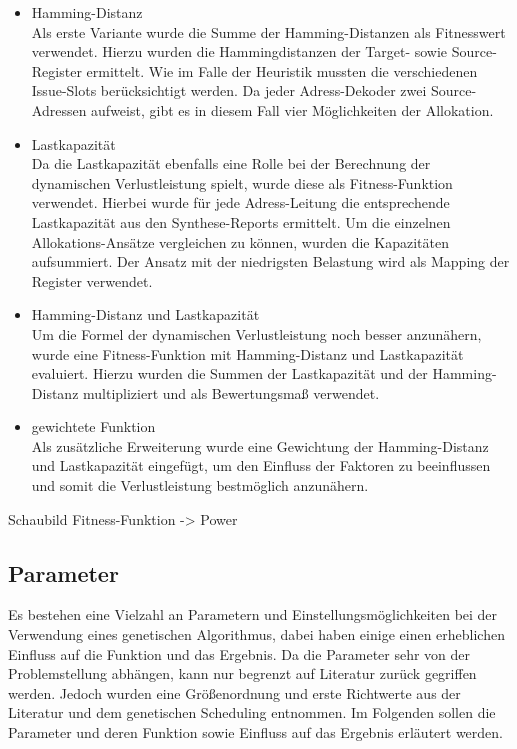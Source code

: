 \begin{itemize}
	\item Hamming-Distanz\\
		Als erste Variante wurde die Summe der Hamming-Distanzen als Fitnesswert verwendet. Hierzu wurden die Hammingdistanzen der Target- sowie Source-Register ermittelt. Wie im Falle der Heuristik mussten die verschiedenen Issue-Slots berücksichtigt werden. Da jeder Adress-Dekoder zwei Source-Adressen aufweist, gibt es in diesem Fall vier Möglichkeiten der Allokation.
	\item Lastkapazität\\
		Da die Lastkapazität ebenfalls eine Rolle bei der Berechnung der dynamischen Verlustleistung spielt, wurde diese als Fitness-Funktion verwendet. Hierbei wurde für jede Adress-Leitung die entsprechende Lastkapazität aus den Synthese-Reports ermittelt. Um die einzelnen Allokations-Ansätze vergleichen zu können, wurden die Kapazitäten aufsummiert. Der Ansatz mit der niedrigsten Belastung wird als Mapping  der Register verwendet. 
	\item Hamming-Distanz und Lastkapazität\\
		Um die Formel der dynamischen Verlustleistung noch besser anzunähern, wurde eine Fitness-Funktion mit Hamming-Distanz und Lastkapazität evaluiert. Hierzu wurden die Summen der Lastkapazität und der Hamming-Distanz multipliziert und als Bewertungsmaß verwendet.
	\item gewichtete Funktion\\
		Als zusätzliche Erweiterung wurde eine Gewichtung der Hamming-Distanz und Lastkapazität eingefügt, um den Einfluss der Faktoren zu beeinflussen und somit die Verlustleistung bestmöglich anzunähern.
\end{itemize}

Schaubild Fitness-Funktion -> Power
 
\subsection{Parameter}
\label{cap:parameter}
Es bestehen eine Vielzahl an Parametern und Einstellungsmöglichkeiten bei der Verwendung eines genetischen Algorithmus, dabei haben einige einen erheblichen Einfluss auf die Funktion und das Ergebnis. Da die Parameter sehr von der Problemstellung abhängen, kann nur begrenzt auf Literatur zurück gegriffen werden. Jedoch wurden eine Größenordnung und erste Richtwerte aus der Literatur \cite{grefenstette1986optimization} und dem genetischen Scheduling entnommen. Im Folgenden sollen die Parameter und deren Funktion sowie Einfluss auf das Ergebnis erläutert werden.

